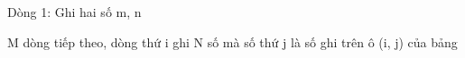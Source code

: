 Dòng 1: Ghi hai số m, n

M dòng tiếp theo, dòng thứ i ghi N số mà số thứ j là số ghi trên ô (i, j) của bảng